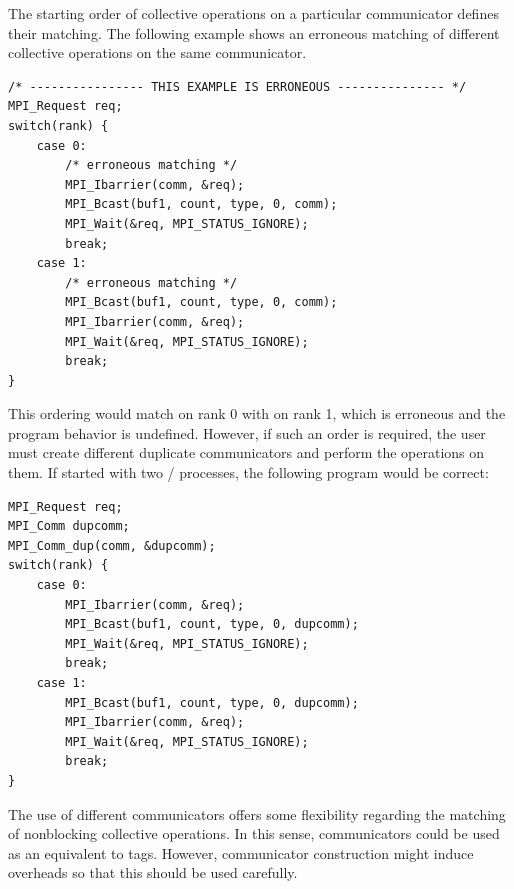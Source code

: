 \begin{example}
\label{coll-nbexN2}
%
%
The starting order of collective operations on a particular communicator
defines their matching. The following example shows an erroneous
matching of different collective operations on the same communicator.

\begin{lstlisting}[language={[MPI]C}]
/* ---------------- THIS EXAMPLE IS ERRONEOUS --------------- */
MPI_Request req;
switch(rank) {
    case 0:
        /* erroneous matching */
        MPI_Ibarrier(comm, &req);
        MPI_Bcast(buf1, count, type, 0, comm);
        MPI_Wait(&req, MPI_STATUS_IGNORE);
        break;
    case 1:
        /* erroneous matching */
        MPI_Bcast(buf1, count, type, 0, comm);
        MPI_Ibarrier(comm, &req);
        MPI_Wait(&req, MPI_STATUS_IGNORE);
        break;
}
\end{lstlisting}

This ordering would match  on rank 0 with
 on rank 1, which is erroneous and the program behavior is
undefined. However, if such an order is required, the user must create
different duplicate communicators and perform the operations on them.
If started with two \MPI/ processes, the following program would be correct:

\begin{lstlisting}[language={[MPI]C}]
MPI_Request req;
MPI_Comm dupcomm;
MPI_Comm_dup(comm, &dupcomm);
switch(rank) {
    case 0:
        MPI_Ibarrier(comm, &req);
        MPI_Bcast(buf1, count, type, 0, dupcomm);
        MPI_Wait(&req, MPI_STATUS_IGNORE);
        break;
    case 1:
        MPI_Bcast(buf1, count, type, 0, dupcomm);
        MPI_Ibarrier(comm, &req);
        MPI_Wait(&req, MPI_STATUS_IGNORE);
        break;
}
\end{lstlisting}

\end{example}

\begin{users}
The use of different communicators offers some flexibility regarding the
matching of nonblocking collective operations. In this sense,
communicators could be used as an equivalent to tags. However,
communicator construction might induce overheads so that this should be
used carefully.
\end{users}


